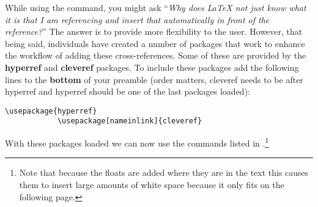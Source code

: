 		While using the  command, you might ask \enquote{\textit{Why does \LaTeX{} not just know what it is that I am referencing and insert that automatically in front of the reference?}}
		The answer is to provide more flexibility to the user.
		However, that being said, individuals have created a number of packages that work to enhance the workflow of adding these cross-references.
		Some of these are provided by the \textbf{hyperref} and \textbf{cleveref} packages.
		To include these packages add the following lines to the \textbf{bottom} of your preamble (order matters, cleveref needs to be after hyperref and hyperref should be one of the last packages loaded):
		\begin{lstlisting}[style=LaTeXStyle]
			\usepackage{hyperref}
			\usepackage[nameinlink]{cleveref}
		\end{lstlisting}
		With these packages loaded we can now use the commands listed in .\footnote{Note that because the floats are added where they are in the text this causes them to insert large amounts of white space because it only fits on the following page.}
